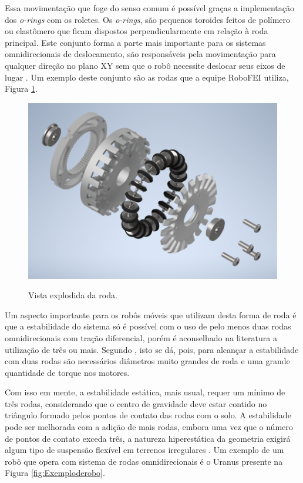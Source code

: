 \documentclass[deposito, acronym, symbols]{fei}
\begin{document}
Essa movimentação que foge do senso comum é possível graças a implementação dos \textit{o-rings} com os roletes. Os \textit{o-rings}, são pequenos toroides feitos de polímero ou elastômero que ficam dispostos perpendicularmente em relação à roda principal. Este conjunto forma a parte mais importante para os sistemas omnidirecionais de deslocamento, são responsáveis pela movimentação para qualquer direção no plano XY sem que o robô necessite deslocar seus eixos de lugar \cite{kinematic}. Um exemplo deste conjunto são as rodas que a equipe RoboFEI utiliza, Figura \ref{fig:rodaExplodida}.

\begin{figure}[!htb]
    \centering
    \caption{Vista explodida da roda.}
    \includegraphics[width=0.6\linewidth]{VistaExplodidaRodaMontada.png}
    \label{fig:rodaExplodida}
\end{figure}

Um aspecto importante para os robôs móveis que utilizam desta forma de roda é que a estabilidade do sistema só é possível com o uso de pelo menos duas rodas omnidirecionais com tração diferencial, porém é aconselhado na literatura a utilização de três ou mais. Segundo \textcite{siegwart2011introduction}, isto se dá, pois, para alcançar a estabilidade com duas rodas são necessários diâmetros muito grandes de roda e uma grande quantidade de torque nos motores.

Com isso em mente, a estabilidade estática, mais usual, requer um mínimo de três rodas, considerando que o centro de gravidade deve estar contido no triângulo formado pelos pontos de contato das rodas com o solo. A estabilidade pode ser melhorada com a adição de mais rodas, embora uma vez que o número de pontos de contato exceda três, a natureza hiperestática da geometria exigirá algum tipo de suspensão flexível em terrenos irregulares \cite{siegwart2011introduction}. Um exemplo de um robô que opera com sistema de rodas omnidirecionais é o Uranus presente na Figura \ref{fig:Exemploderobo}.
\end{document}
